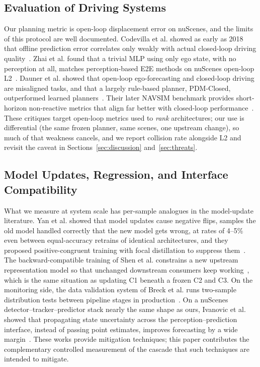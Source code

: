 \documentclass[conference]{IEEEtran}
\begin{document}
\subsection{Evaluation of Driving Systems}
Our planning metric is open-loop displacement error on nuScenes, and the
limits of this protocol are well documented. Codevilla et al. showed as early
as 2018 that offline prediction error correlates only weakly with actual
closed-loop driving quality~\cite{codevilla2018offline}. Zhai et al. found
that a trivial MLP using only ego state, with no perception at all, matches
perception-based E2E methods on nuScenes open-loop
L2~\cite{zhai2023rethinking}. Dauner et al. showed that open-loop
ego-forecasting and closed-loop driving are misaligned tasks, and that a
largely rule-based planner, PDM-Closed, outperformed learned
planners~\cite{dauner2023parting}. Their later NAVSIM benchmark provides short-horizon non-reactive metrics that
align far better with closed-loop performance~\cite{dauner2024navsim}. These
critiques target open-loop metrics used to \emph{rank} architectures; our use
is differential (the same frozen planner, same scenes, one upstream change), so
much of that weakness cancels, and we report collision rate alongside L2 and
revisit the caveat in Sections~\ref{sec:discussion} and~\ref{sec:threats}.

\subsection{Model Updates, Regression, and Interface Compatibility}
What we measure at system scale has per-sample analogues in the model-update
literature. Yan et al. showed that model updates cause negative flips, samples
the old model handled correctly that the new model gets wrong, at rates of
4--5\% even between equal-accuracy retrains of identical architectures, and
they proposed positive-congruent training with focal distillation to suppress
them~\cite{yan2021pctraining}. The backward-compatible training of Shen et al.
constrains a new upstream representation model so that unchanged downstream
consumers keep working~\cite{shen2020bct}, which is the same situation as
updating C1 beneath a frozen C2 and C3. On the monitoring side, the data
validation system of Breck et al. runs two-sample distribution tests between
pipeline stages in production~\cite{breck2019data}. On a nuScenes
detector--tracker--predictor stack nearly the same shape as ours, Ivanovic et
al. showed that propagating state uncertainty across the
perception--prediction interface, instead of passing point estimates, improves
forecasting by a wide margin~\cite{ivanovic2022propagating}. These works
provide mitigation techniques; this paper contributes the complementary
controlled measurement of the cascade that such techniques are intended to
mitigate.
\end{document}
